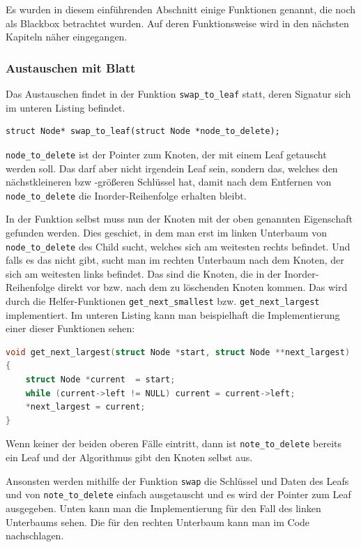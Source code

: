 \documentclass[11pt]{article}
\newcommand{\lstin}[1]{\lstinline[language=C]{#1}}
\begin{document}
Es wurden in diesem einführenden Abschnitt einige Funktionen genannt, die noch als Blackbox
betrachtet wurden. Auf deren Funktionsweise wird in den nächsten Kapiteln näher eingegangen.

\subsubsection{Austauschen mit Blatt}

Das Austauschen findet in der Funktion \lstin{swap_to_leaf} statt, deren Signatur sich im unteren Listing befindet.

\begin{lstlisting}
struct Node* swap_to_leaf(struct Node *node_to_delete);
\end{lstlisting}

\lstin{node_to_delete} ist der Pointer zum Knoten, der mit einem Leaf getauscht werden soll. Das darf aber nicht irgendein Leaf sein, sondern das, welches den nächstkleineren bzw -größeren Schlüssel hat, damit
nach dem Entfernen von \lstin{node_to_delete} die Inorder-Reihenfolge erhalten bleibt.

In der Funktion selbst muss nun der Knoten mit der oben genannten Eigenschaft gefunden werden. Dies geschiet, in dem man erst im linken Unterbaum von \lstin{node_to_delete} des Child sucht, welches sich am weitesten rechts befindet.
Und falls es das nicht gibt, sucht man im rechten Unterbaum nach dem Knoten, der sich am weitesten links befindet. Das sind die Knoten, die in der Inorder-Reihenfolge direkt vor bzw. nach dem zu löschenden Knoten kommen.
Das wird durch die Helfer-Funktionen \lstin{get_next_smallest} bzw. \lstin{get_next_largest} implementiert. Im unteren Listing kann man beispielhaft die Implementierung einer dieser Funktionen sehen:

\begin{lstlisting}[language=C]
void get_next_largest(struct Node *start, struct Node **next_largest)
{
    struct Node *current  = start;
    while (current->left != NULL) current = current->left;
    *next_largest = current;
}
\end{lstlisting}

Wenn keiner der beiden oberen Fälle eintritt, dann ist \lstin{note_to_delete} bereits ein Leaf und der Algorithmus gibt den Knoten selbst aus.

Ansonsten werden mithilfe der Funktion \lstin{swap} die Schlüssel und Daten des Leafs und von \lstin{note_to_delete} einfach ausgetauscht und es wird der Pointer zum Leaf ausgegeben.
Unten kann man die Implementierung für den Fall des linken Unterbaums sehen. 
Die für den rechten Unterbaum kann man im Code nachschlagen.
\end{document}
